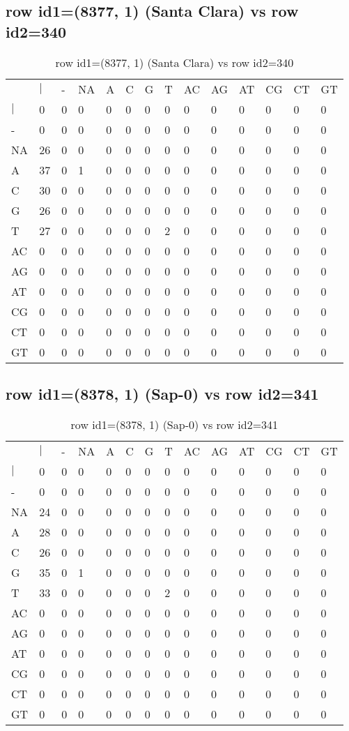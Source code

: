 \subsection{row id1=(8377, 1) (Santa Clara) vs row id2=340}
\begin{center}
\begin{longtable}{|l|l|l|l|l|l|l|l|l|l|l|l|l|l|}
\caption{row id1=(8377, 1) (Santa Clara) vs row id2=340} \label{table_dm616}\\
\hline
\\
\hline
&$|$&-&NA&A&C&G&T&AC&AG&AT&CG&CT&GT\\
$|$&0&0&0&0&0&0&0&0&0&0&0&0&0\\
-&0&0&0&0&0&0&0&0&0&0&0&0&0\\
NA&26&0&0&0&0&0&0&0&0&0&0&0&0\\
A&37&0&1&0&0&0&0&0&0&0&0&0&0\\
C&30&0&0&0&0&0&0&0&0&0&0&0&0\\
G&26&0&0&0&0&0&0&0&0&0&0&0&0\\
T&27&0&0&0&0&0&2&0&0&0&0&0&0\\
AC&0&0&0&0&0&0&0&0&0&0&0&0&0\\
AG&0&0&0&0&0&0&0&0&0&0&0&0&0\\
AT&0&0&0&0&0&0&0&0&0&0&0&0&0\\
CG&0&0&0&0&0&0&0&0&0&0&0&0&0\\
CT&0&0&0&0&0&0&0&0&0&0&0&0&0\\
GT&0&0&0&0&0&0&0&0&0&0&0&0&0\\
\hline
\end{longtable}
\end{center}

\subsection{row id1=(8378, 1) (Sap-0) vs row id2=341}
\begin{center}
\begin{longtable}{|l|l|l|l|l|l|l|l|l|l|l|l|l|l|}
\caption{row id1=(8378, 1) (Sap-0) vs row id2=341} \label{table_dm618}\\
\hline
\\
\hline
&$|$&-&NA&A&C&G&T&AC&AG&AT&CG&CT&GT\\
$|$&0&0&0&0&0&0&0&0&0&0&0&0&0\\
-&0&0&0&0&0&0&0&0&0&0&0&0&0\\
NA&24&0&0&0&0&0&0&0&0&0&0&0&0\\
A&28&0&0&0&0&0&0&0&0&0&0&0&0\\
C&26&0&0&0&0&0&0&0&0&0&0&0&0\\
G&35&0&1&0&0&0&0&0&0&0&0&0&0\\
T&33&0&0&0&0&0&2&0&0&0&0&0&0\\
AC&0&0&0&0&0&0&0&0&0&0&0&0&0\\
AG&0&0&0&0&0&0&0&0&0&0&0&0&0\\
AT&0&0&0&0&0&0&0&0&0&0&0&0&0\\
CG&0&0&0&0&0&0&0&0&0&0&0&0&0\\
CT&0&0&0&0&0&0&0&0&0&0&0&0&0\\
GT&0&0&0&0&0&0&0&0&0&0&0&0&0\\
\hline
\end{longtable}
\end{center}

